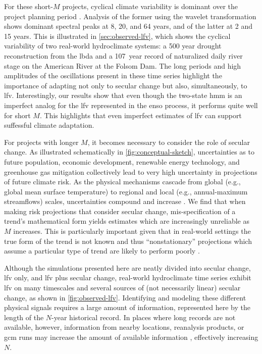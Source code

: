 \documentclass[
  draft,
  linenumbers
]{agujournal2018}
\makeatletter
\newcommand{\eg}{e.g.\@\xspace}
\makeatother
\begin{document}
For these short-$M$ projects, cyclical climate variability is dominant over the project planning period \citep{Hodgkins:2017hw, Jain:2001hz}.
Analysis of the former using the wavelet transformation \citep{Torrence:1998jp} shows dominant spectral peaks at 8, 20, and 64 years, and of the latter at 2 and 15 years.
This is illustrated in \cref{sec:observed-lfv}, which shows the cyclical variability of two real-world hydroclimate systems: a 500 year drought reconstruction from the \gls{lbda} \citep{Cook:2010bz} and a \SI{107}{year} record of naturalized daily river stage on the American River at the Folsom Dam.
The long periods and high amplitudes of the oscillations present in these time series highlight the importance of adapting not only to secular change but also, simultaneously, to \gls{lfv}.
Interestingly, our results show that even though the two-state \gls{hmm} is an imperfect analog for the \gls{lfv} represented in the \gls{enso} process, it performs quite well for short $M$.
This highlights that even imperfect estimates of \gls{lfv} can support suffessful climate adaptation.

For projects with longer $M$, it becomes necessary to consider the role of secular change.
As illustrated schematically in \cref{fig:conceptual-sketch}, uncertainties as to future population, economic development, renewable energy technology, and greenhouse gas mitigation collectively lead to very high uncertainty in projections of future climate risk.
As the physical mechanisms cascade from global (\eg, global mean surface temperature) to regional  \citep[\eg, storm track position][]{Barnes:2015gl} and local (\eg, annual-maximum streamflows) scales, uncertainties compound and increase \citep{Dittes:2017he}.
We find that when making risk projections that consider secular change, mis-specification of a trend's mathematical form yields estimates which are increasingly unreliable as $M$ increases.
This is particularly important given that in real-world settings the true form of the trend is not known and thus ``nonstationary'' projections which assume a particular type of trend are likely to perform poorly \citep{Montanari:2014hl, Serinaldi:2015bq}.

Although the simulations presented here are neatly divided into secular change, \gls{lfv} only, and \gls{lfv} plus secular change, real-world hydroclimate time series exhibit \gls{lfv} on many timescales and several sources of (not necessarily linear) secular change, as shown in \cref{fig:observed-lfv}.
Identifying and modeling these different physical signals requires a large amount of information, represented here by the length of the $N$-year historical record.
In places where long records are not available, however, information from nearby locations, reanalysis products, or \acrshort{gcm} runs may increase the amount of available information \citep{Merz:2008eh}, effectively increasing $N$.
\end{document}
